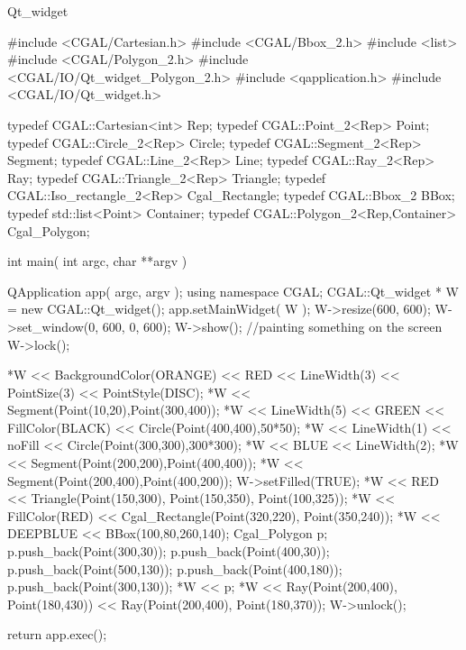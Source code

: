 \begin{ccRefClass}{Qt_widget}
\begin{ccExampleCode}
#include <CGAL/Cartesian.h>
#include <CGAL/Bbox_2.h>
#include <list>
#include <CGAL/Polygon_2.h>
#include <CGAL/IO/Qt_widget_Polygon_2.h>
#include <qapplication.h>
#include <CGAL/IO/Qt_widget.h>

typedef CGAL::Cartesian<int>   Rep;
typedef CGAL::Point_2<Rep>     Point;
typedef CGAL::Circle_2<Rep>    Circle;
typedef CGAL::Segment_2<Rep>   Segment;
typedef CGAL::Line_2<Rep>      Line;
typedef CGAL::Ray_2<Rep>       Ray;
typedef CGAL::Triangle_2<Rep>  Triangle;
typedef CGAL::Iso_rectangle_2<Rep>
                               Cgal_Rectangle;
typedef CGAL::Bbox_2           BBox;
typedef std::list<Point>       Container;
typedef CGAL::Polygon_2<Rep,Container>
                               Cgal_Polygon;

int main( int argc, char **argv )
{
  QApplication app( argc, argv );
  using namespace CGAL;
  CGAL::Qt_widget * W = new CGAL::Qt_widget();
  app.setMainWidget( W );
  W->resize(600, 600);
  W->set_window(0, 600, 0, 600);
  W->show();
  //painting something on the screen
  W->lock();

  *W << BackgroundColor(ORANGE) << RED <<
  LineWidth(3) << PointSize(3) << PointStyle(DISC);
  *W << Segment(Point(10,20),Point(300,400));
  *W << LineWidth(5) << GREEN << FillColor(BLACK) <<
    Circle(Point(400,400),50*50);
  *W << LineWidth(1) << noFill << Circle(Point(300,300),300*300);
  *W << BLUE << LineWidth(2);
  *W << Segment(Point(200,200),Point(400,400));
  *W << Segment(Point(200,400),Point(400,200));
  W->setFilled(TRUE);
  *W << RED << Triangle(Point(150,300),
                                  Point(150,350),
                                  Point(100,325));
  *W << FillColor(RED) << Cgal_Rectangle(Point(320,220),
                                              Point(350,240));
  *W << DEEPBLUE << BBox(100,80,260,140);
  Cgal_Polygon p;
  p.push_back(Point(300,30));
  p.push_back(Point(400,30));
  p.push_back(Point(500,130));
  p.push_back(Point(400,180));
  p.push_back(Point(300,130));
  *W << p;
  *W << Ray(Point(200,400), Point(180,430))
    << Ray(Point(200,400), Point(180,370));
  W->unlock();

  return app.exec();
}
\end{ccExampleCode}

\end{ccRefClass}







